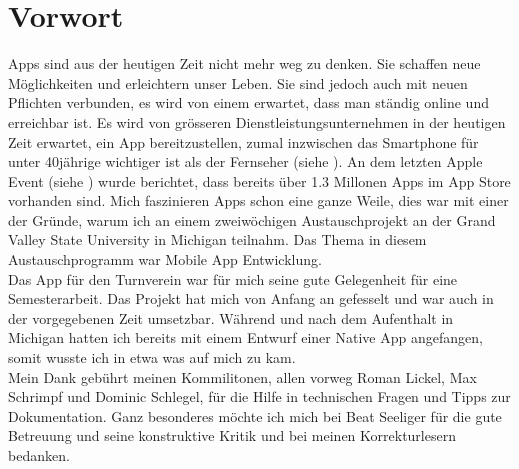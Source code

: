 \chapter*{Vorwort}\label{vorwort}
Apps sind aus der heutigen Zeit nicht mehr weg zu denken. Sie schaffen neue Möglichkeiten und erleichtern unser Leben. Sie sind jedoch auch mit neuen Pflichten verbunden, es wird von einem erwartet, dass man ständig online und erreichbar ist. Es wird von grösseren Dienstleistungsunternehmen in der heutigen Zeit erwartet, ein App bereitzustellen, zumal inzwischen das Smartphone für unter 40jährige wichtiger ist als der Fernseher (siehe \cite{digitalisierungsbericht2014}). An dem letzten Apple Event (siehe \cite{apple_event_sept_2014}) wurde berichtet, dass bereits über 1.3 Millonen Apps im App Store vorhanden sind. Mich faszinieren Apps schon eine ganze Weile, dies war mit einer der Gründe, warum ich an einem zweiwöchigen Austauschprojekt an der Grand Valley State University in Michigan teilnahm. Das Thema in diesem Austauschprogramm war Mobile App Entwicklung.\\

Das App für den Turnverein war für mich seine gute Gelegenheit für eine Semesterarbeit. Das Projekt hat mich von Anfang an gefesselt und war auch in der vorgegebenen Zeit umsetzbar. Während und nach dem Aufenthalt in Michigan hatten ich bereits mit einem Entwurf einer Native App angefangen, somit wusste ich in etwa was auf mich zu kam.\\

Mein Dank gebührt meinen Kommilitonen, allen vorweg Roman Lickel, Max Schrimpf und Dominic Schlegel, für die Hilfe in technischen Fragen und Tipps zur Dokumentation. Ganz besonderes möchte ich mich bei Beat Seeliger für die gute Betreuung und seine konstruktive Kritik und bei meinen Korrekturlesern bedanken.